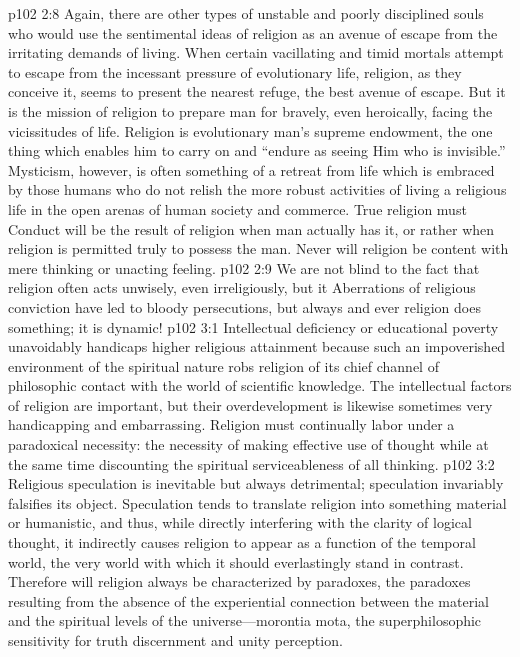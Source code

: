 \vs p102 2:8 Again, there are other types of unstable and poorly disciplined souls who would use the sentimental ideas of religion as an avenue of escape from the irritating demands of living. When certain vacillating and timid mortals attempt to escape from the incessant pressure of evolutionary life, religion, as they conceive it, seems to present the nearest refuge, the best avenue of escape. But it is the mission of religion to prepare man for bravely, even heroically, facing the vicissitudes of life. Religion is evolutionary man’s supreme endowment, the one thing which enables him to carry on and “endure as seeing Him who is invisible.” Mysticism, however, is often something of a retreat from life which is embraced by those humans who do not relish the more robust activities of living a religious life in the open arenas of human society and commerce. True religion must  Conduct will be the result of religion when man actually has it, or rather when religion is permitted truly to possess the man. Never will religion be content with mere thinking or unacting feeling.
\vs p102 2:9 We are not blind to the fact that religion often acts unwisely, even irreligiously, but it  Aberrations of religious conviction have led to bloody persecutions, but always and ever religion does something; it is dynamic!
\vs p102 3:1 Intellectual deficiency or educational poverty unavoidably handicaps higher religious attainment because such an impoverished environment of the spiritual nature robs religion of its chief channel of philosophic contact with the world of scientific knowledge. The intellectual factors of religion are important, but their overdevelopment is likewise sometimes very handicapping and embarrassing. Religion must continually labor under a paradoxical necessity: the necessity of making effective use of thought while at the same time discounting the spiritual serviceableness of all thinking.
\vs p102 3:2 Religious speculation is inevitable but always detrimental; speculation invariably falsifies its object. Speculation tends to translate religion into something material or humanistic, and thus, while directly interfering with the clarity of logical thought, it indirectly causes religion to appear as a function of the temporal world, the very world with which it should everlastingly stand in contrast. Therefore will religion always be characterized by paradoxes, the paradoxes resulting from the absence of the experiential connection between the material and the spiritual levels of the universe---morontia mota, the superphilosophic sensitivity for truth discernment and unity perception.
